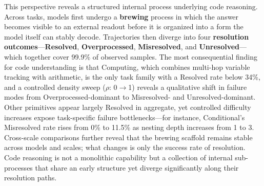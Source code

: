 This perspective reveals a structured internal process underlying code reasoning. Across tasks, models first undergo a \textbf{brewing} process in which the answer becomes visible to an external readout before it is organized into a form the model itself can stably decode. Trajectories then diverge into four \textbf{resolution outcomes}---\textbf{Resolved}, \textbf{Overprocessed}, \textbf{Misresolved}, and \textbf{Unresolved}---which together cover 99.9\% of observed samples. The most consequential finding for code understanding is that Computing, which combines multi-hop variable tracking with arithmetic, is the only task family with a Resolved rate below 34\%, and a controlled density sweep ($\rho$: 0$\to$1) reveals a qualitative shift in failure modes from Overprocessed-dominant to Misresolved- and Unresolved-dominant. Other primitives appear largely Resolved in aggregate, yet controlled difficulty increases expose task-specific failure bottlenecks---for instance, Conditional's Misresolved rate rises from 0\% to 11.5\% as nesting depth increases from 1 to 3. Cross-scale comparisons further reveal that the brewing scaffold remains stable across models and scales; what changes is only the success rate of resolution. Code reasoning is not a monolithic capability but a collection of internal sub-processes that share an early structure yet diverge significantly along their resolution paths.

